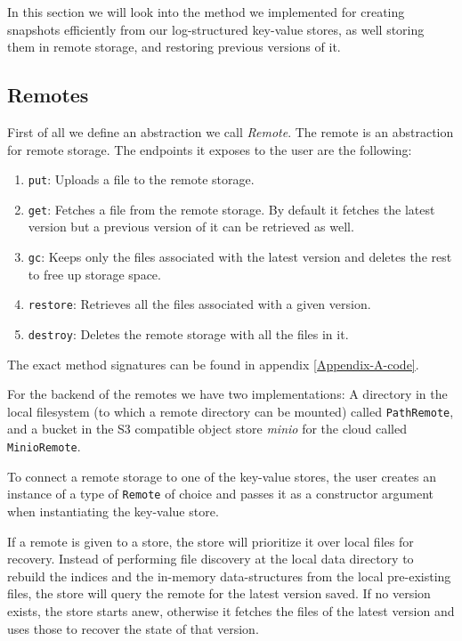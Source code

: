 In this section we will look into the method we implemented for creating snapshots efficiently from our log-structured key-value stores, as well storing them in remote storage, and restoring previous versions of it.

\subsection{Remotes}

First of all we define an abstraction we call \textit{Remote}.
The remote is an abstraction for remote storage.
The endpoints it exposes to the user are the following:

\begin{enumerate}
    \item \verb|put|: Uploads a file to the remote storage.
    \item \verb|get|: Fetches a file from the remote storage. By default it fetches the latest version but a previous version of it can be retrieved as well.
    \item \verb|gc|: Keeps only the files associated with the latest version and deletes the rest to free up storage space.
    \item \verb|restore|: Retrieves all the files associated with a given version.
    \item \verb|destroy|: Deletes the remote storage with all the files in it.
\end{enumerate}

The exact method signatures can be found in appendix \ref{Appendix-A-code}.

For the backend of the remotes we have two implementations: A directory in the local filesystem (to which a remote directory can be mounted) called \verb|PathRemote|, and a bucket in the S3 compatible object store \textit{minio} for the cloud called \verb|MinioRemote|.

To connect a remote storage to one of the key-value stores, the user creates an instance of a type of \verb|Remote| of choice and passes it as a constructor argument when instantiating the key-value store.

If a remote is given to a store, the store will prioritize it over local files for recovery. Instead of performing file discovery at the local data directory to rebuild the indices and the in-memory data-structures from the local pre-existing files, the store will query the remote for the latest version saved. If no version exists, the store starts anew, otherwise it fetches the files of the latest version and uses those to recover the state of that version.

